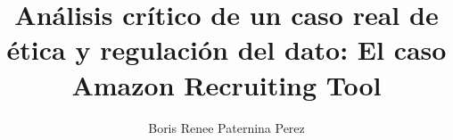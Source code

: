 \newcommand{\Titulo}{Análisis crítico de un caso real de ética y regulación del dato: El caso Amazon Recruiting Tool}

\newcommand{\Asignatura}{Ética y Regulación en Big Data}

\newcommand{\NombreAutor}{Boris Renee Paternina Perez}

\title{\Titulo}
\author{\NombreAutor}
